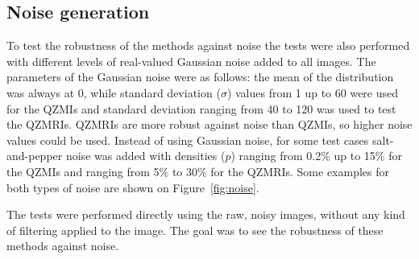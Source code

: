 \subsection{Noise generation}
To test the robustness of the methods against noise the tests were also performed with different levels of real-valued Gaussian noise added to all images. The parameters of the Gaussian noise were as follows: the mean of the distribution was always at 0, while standard deviation ($\sigma$) values from 1 up to 60 were used for the QZMIs and standard deviation ranging from 40 to 120 was used to test the QZMRIs. QZMRIs are more robust against noise than QZMIs, so higher noise values could be used.
Instead of using Gaussian noise, for some test cases salt-and-pepper noise was added with densities ($p$) ranging from 0.2\% up to 15\% for the QZMIs and ranging from 5\% to 30\% for the QZMRIs. Some examples for both types of noise are shown on Figure~\ref{fig:noise}.


The tests were performed directly using the raw, noisy images, without any kind of filtering applied to the image. The goal was to see the robustness of these methods against noise. 

